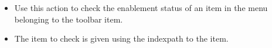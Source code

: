 
\begin{itemize}
\item Use this action to check the enablement status of an item in the menu belonging to the toolbar item.
\item The item to check is given using the indexpath to the item.
\end{itemize}
